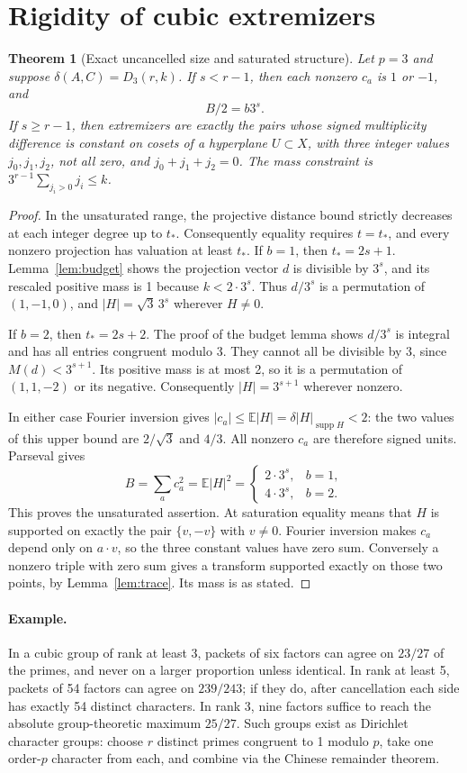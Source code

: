 \documentclass[11pt]{article}
\newtheorem{theorem}{Theorem}[section]
\theoremstyle{definition}\newtheorem{definition}[theorem]{Definition}
\theoremstyle{remark}\newtheorem{remark}[theorem]{Remark}
\newcommand{\E}{\mathbb E}
\newcommand{\supp}{\operatorname{supp}}
\begin{document}
\section{Rigidity of cubic extremizers}
\begin{theorem}[Exact uncancelled size and saturated structure]\label{thm:rigidity}
Let $p=3$ and suppose $\delta(A,C)=D_3(r,k)$. If $s<r-1$, then each nonzero $c_a$ is $1$ or $-1$, and
\[ B/2=b3^s. \]
If $s\ge r-1$, then extremizers are exactly the pairs whose signed multiplicity difference is constant on cosets of a hyperplane $U\subset X$, with three integer values $j_0,j_1,j_2$, not all zero, and $j_0+j_1+j_2=0$. The mass constraint is $3^{r-1}\sum_{j_i>0}j_i\le k$.
\end{theorem}
\begin{proof}
In the unsaturated range, the projective distance bound strictly decreases at each integer degree up to $t_*$. Consequently equality requires $t=t_*$, and every nonzero projection has valuation at least $t_*$. If $b=1$, then $t_*=2s+1$. Lemma~\ref{lem:budget} shows the projection vector $d$ is divisible by $3^s$, and its rescaled positive mass is 1 because $k<2\cdot3^s$. Thus $d/3^s$ is a permutation of $(1,-1,0)$, and $|H|=\sqrt3\,3^s$ wherever $H\ne0$.

If $b=2$, then $t_*=2s+2$. The proof of the budget lemma shows $d/3^s$ is integral and has all entries congruent modulo 3. They cannot all be divisible by 3, since $M(d)<3^{s+1}$. Its positive mass is at most 2, so it is a permutation of $(1,1,-2)$ or its negative. Consequently $|H|=3^{s+1}$ wherever nonzero.

In either case Fourier inversion gives $|c_a|\le \E|H|=\delta|H|_{\supp H}<2$: the two values of this upper bound are $2/\sqrt3$ and $4/3$. All nonzero $c_a$ are therefore signed units. Parseval gives
\[
 B=\sum_a c_a^2=\E|H|^2=\begin{cases}2\cdot3^s,&b=1,\\4\cdot3^s,&b=2.\end{cases}
\]
This proves the unsaturated assertion. At saturation equality means that $H$ is supported on exactly the pair $\{v,-v\}$ with $v\ne0$. Fourier inversion makes $c_a$ depend only on $a\cdot v$, so the three constant values have zero sum. Conversely a nonzero triple with zero sum gives a transform supported exactly on those two points, by Lemma~\ref{lem:trace}. Its mass is as stated.
\end{proof}

\paragraph{Example.} In a cubic group of rank at least 3, packets of six factors can agree on $23/27$ of the primes, and never on a larger proportion unless identical. In rank at least 5, packets of 54 factors can agree on $239/243$; if they do, after cancellation each side has exactly 54 distinct characters. In rank 3, nine factors suffice to reach the absolute group-theoretic maximum $25/27$. Such groups exist as Dirichlet character groups: choose $r$ distinct primes congruent to 1 modulo $p$, take one order-$p$ character from each, and combine via the Chinese remainder theorem.
\end{document}
